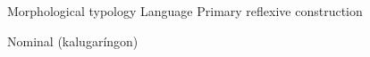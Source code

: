 \documentclass[output=paper]{langsci/langscibook}
\begin{document}
Morphological typology
Language
Primary reflexive construction

Nominal (kalugaríngon)

































{\sloppy\printbibliography[heading=subbibliography,notkeyword=this]}
\end{document}
